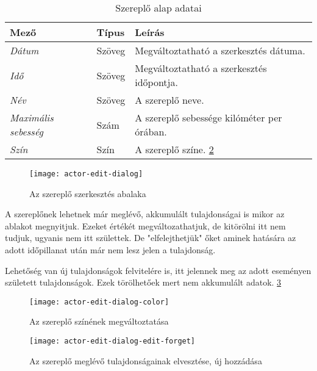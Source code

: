 \begin{table}[H]
	\centering
	\begin{tabular}{ | m{} | m{} | m{} | }
		\hline
		\textbf{Mező} & \textbf{Típus} & \textbf{Leírás} \\
		\hline \hline
		\emph{Dátum} & Szöveg & Megváltoztatható a szerkesztés dátuma. \\
		\hline
		\emph{Idő} & Szöveg & Megváltoztatható a szerkesztés időpontja. \\
		\hline
		\emph{Név} & Szöveg & A szereplő neve.  \\
		\hline
		\emph{Maximális sebesség} & Szám & A szereplő sebessége kilóméter per órában. \\
		\hline
		\emph{Szín} & Szín & A szereplő színe. \ref{fig:actor-edit-dialog-color}  \\
		\hline
	\end{tabular}
	\caption{Szereplő alap adatai}
	\label{tab:create-project-form}
\end{table}

\begin{figure}[h!]
	\centering
	\texttt{[image: actor-edit-dialog]}
	\caption{Az szereplő szerkesztés abalaka}
	\label{fig:actor-edit-dialog}
\end{figure}

A szereplőnek lehetnek már meglévő, akkumulált tulajdonságai is mikor az ablakot megnyitjuk. Ezeket értékét megváltozathatjuk, de kitörölni itt nem tudjuk, ugyanis nem itt születtek. De "elfelejthetjük" őket aminek hatására az adott időpillanat után már nem lesz jelen a tulajdonság.

Lehetőség van új tulajdonságok felvitelére is, itt jelennek meg az adott eseményen született tulajdonságok. Ezek törölhetőek mert nem akkumulált adatok. \ref{fig:actor-edit-dialog-edit-forget}

\begin{figure}[h!]
	\centering
	\texttt{[image: actor-edit-dialog-color]}
	\caption{Az szereplő színének megváltoztatása}
	\label{fig:actor-edit-dialog-color}
\end{figure}

\begin{figure}[h!]
	\centering
	\texttt{[image: actor-edit-dialog-edit-forget]}
	\caption{Az szereplő meglévő tulajdonságainak elvesztése, új hozzádása}
	\label{fig:actor-edit-dialog-edit-forget}
\end{figure}


